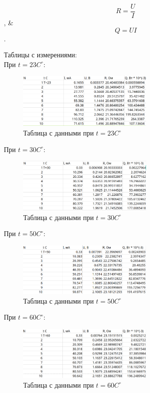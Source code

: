\documentclass[a4paper]{article}
\begin{document}
\[R = \frac{U}{I}\], & \[Q = UI\].

Таблицы с измерениями: \\

При $t = 23C^\circ$:
\begin{figure}[ht]
    \centering
    \includegraphics[width=0.6\textwidth]{tables/T23.png}
    \caption{Таблица с данными при $t = 23C^\circ$}
\end{figure}

При $t = 30C^\circ$:
\begin{figure}[ht]
    \centering
    \includegraphics[width=0.6\textwidth]{tables/T30.png}
    \caption{Таблица с данными при $t = 30C^\circ$}
\end{figure}

При $t = 50C^\circ$:
\begin{figure}[ht]
    \centering
    \includegraphics[width=0.6\textwidth]{tables/T50.png}
    \caption{Таблица с данными при $t = 50C^\circ$}
\end{figure}

\newpage

При $t = 60C^\circ$:
\begin{figure}[ht]
    \centering
    \includegraphics[width=0.6\textwidth]{tables/T60.png}
    \caption{Таблица с данными при $t = 60C^\circ$}
\end{figure}
\end{document}
